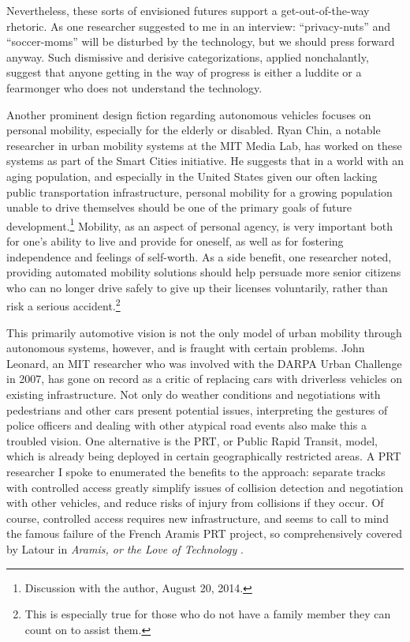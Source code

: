 Nevertheless, these
sorts of envisioned futures support a get-out-of-the-way rhetoric. As
one researcher suggested to me in an interview:
``privacy-nuts'' and ``soccer-moms'' will be disturbed by the
technology, but we should press forward anyway. Such dismissive and
derisive categorizations, applied nonchalantly, suggest that anyone
getting in the way of progress is either a luddite or a fearmonger who
does not understand the technology. 

Another prominent design fiction regarding autonomous vehicles focuses
on personal mobility, especially for the elderly or disabled. Ryan
Chin, a notable researcher in urban mobility systems at the MIT Media
Lab, has worked on these systems as part of the Smart Cities
initiative. He suggests that in a world with an aging population, and
especially in the United States given our often lacking public
transportation infrastructure, personal mobility for a growing
population unable to drive themselves should be one of the primary
goals of future development.\footnote{Discussion with the author,
  August 20, 2014.} Mobility, as an aspect of personal agency, is very important both
for one's ability to live and provide for oneself, as well as for
fostering independence and feelings of self-worth. As a side benefit,
one researcher noted, providing automated mobility solutions should
help persuade more senior citizens who can no longer drive safely to
give up their licenses voluntarily, rather than risk a serious
accident.\footnote{This is especially true for those who do not have a
  family member they can count on to assist them.}

This primarily automotive vision is not the only model of urban
mobility through autonomous systems, however, and is fraught with
certain problems. John Leonard, an MIT researcher who was involved
with the DARPA Urban Challenge in 2007, has gone on record as a critic
of replacing cars with driverless vehicles on existing infrastructure.
Not only do weather conditions and negotiations with pedestrians and
other cars present potential issues, interpreting the gestures of
police officers and dealing with other atypical road events also make
this a troubled vision. One alternative is the PRT, or Public Rapid
Transit, model, which is already being deployed in certain
geographically restricted areas. A PRT researcher I spoke to
enumerated the benefits to the approach: separate tracks with
controlled access greatly simplify issues of collision detection and
negotiation with other vehicles, and reduce risks of injury from collisions if
they occur. Of course, controlled access requires new infrastructure,
and seems to call to mind the famous failure of the French Aramis PRT
project, so comprehensively covered by Latour in \emph{Aramis, or the
  Love of Technology} \cite{Aramis}. 

